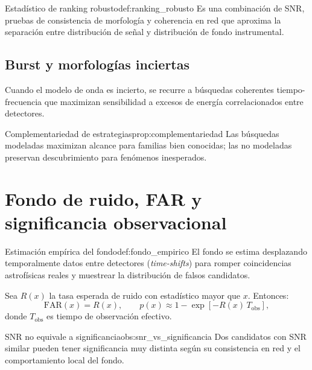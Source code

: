\begin{definicion}{Estadístico de ranking robusto}{def:ranking_robusto}
Es una combinación de SNR, pruebas de consistencia de morfología y coherencia en red que aproxima la separación entre distribución de señal y distribución de fondo instrumental.
\end{definicion}

\subsection{Burst y morfologías inciertas}

Cuando el modelo de onda es incierto, se recurre a búsquedas coherentes tiempo-frecuencia que maximizan sensibilidad a excesos de energía correlacionados entre detectores.

\begin{proposicion}{Complementariedad de estrategias}{prop:complementariedad}
Las búsquedas modeladas maximizan alcance para familias bien conocidas; las no modeladas preservan descubrimiento para fenómenos inesperados.
\end{proposicion}

\section{Fondo de ruido, FAR y significancia observacional}
\label{sec:fondo_far_significancia}

\begin{definicion}{Estimación empírica del fondo}{def:fondo_empirico}
El fondo se estima desplazando temporalmente datos entre detectores (\emph{time-shifts}) para romper coincidencias astrofísicas reales y muestrear la distribución de falsos candidatos.
\end{definicion}

Sea $R(x)$ la tasa esperada de ruido con estadístico mayor que $x$. Entonces:
\begin{equation}
\mathrm{FAR}(x)=R(x), \qquad
p(x)\approx 1-\exp[-R(x)\,T_{\mathrm{obs}}],
\end{equation}
donde $T_{\mathrm{obs}}$ es tiempo de observación efectivo.

\begin{observacion}{SNR no equivale a significancia}{obs:snr_vs_significancia}
Dos candidatos con SNR similar pueden tener significancia muy distinta según su consistencia en red y el comportamiento local del fondo.
\end{observacion}


